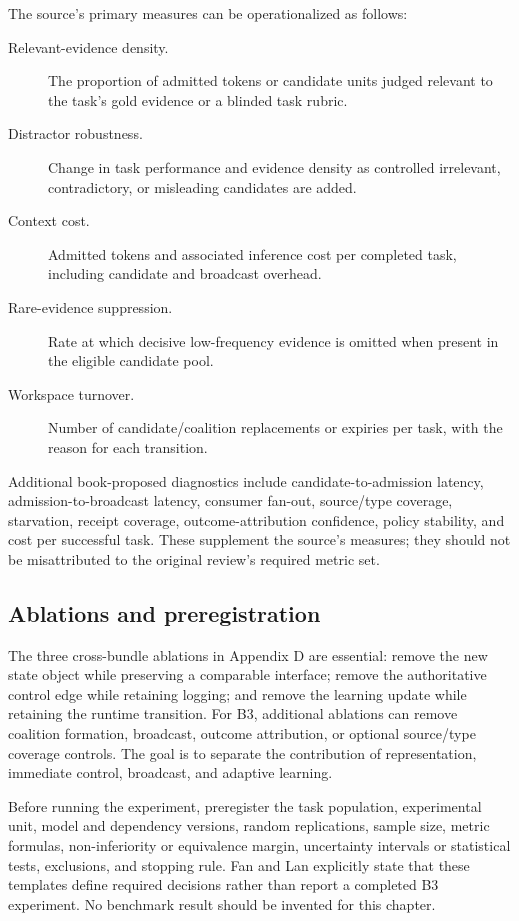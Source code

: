 The source's primary measures can be operationalized as follows:
\begin{description}
  \item[Relevant-evidence density.] The proportion of admitted tokens or candidate units judged relevant to the task's gold evidence or a blinded task rubric.
  \item[Distractor robustness.] Change in task performance and evidence density as controlled irrelevant, contradictory, or misleading candidates are added.
  \item[Context cost.] Admitted tokens and associated inference cost per completed task, including candidate and broadcast overhead.
  \item[Rare-evidence suppression.] Rate at which decisive low-frequency evidence is omitted when present in the eligible candidate pool.
  \item[Workspace turnover.] Number of candidate/coalition replacements or expiries per task, with the reason for each transition.
\end{description}

Additional book-proposed diagnostics include candidate-to-admission latency, admission-to-broadcast latency, consumer fan-out, source/type coverage, starvation, receipt coverage, outcome-attribution confidence, policy stability, and cost per successful task. These supplement the source's measures; they should not be misattributed to the original review's required metric set.

\subsection{Ablations and preregistration}

The three cross-bundle ablations in Appendix D are essential: remove the new state object while preserving a comparable interface; remove the authoritative control edge while retaining logging; and remove the learning update while retaining the runtime transition. For B3, additional ablations can remove coalition formation, broadcast, outcome attribution, or optional source/type coverage controls. The goal is to separate the contribution of representation, immediate control, broadcast, and adaptive learning.

Before running the experiment, preregister the task population, experimental unit, model and dependency versions, random replications, sample size, metric formulas, non-inferiority or equivalence margin, uncertainty intervals or statistical tests, exclusions, and stopping rule. Fan and Lan explicitly state that these templates define required decisions rather than report a completed B3 experiment. No benchmark result should be invented for this chapter.

